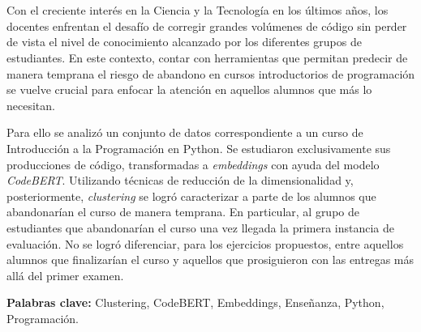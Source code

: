 \chapter*{\runtitulo}

\noindent Con el creciente interés en la Ciencia y la Tecnología en los últimos años, los docentes enfrentan el desafío de corregir grandes volúmenes de código sin perder de vista el nivel de conocimiento alcanzado por los diferentes grupos de estudiantes. En este contexto, contar con herramientas que permitan predecir de manera temprana el riesgo de abandono en cursos introductorios de programación se vuelve crucial para enfocar la atención en aquellos alumnos que más lo necesitan.

Para ello se analizó  un conjunto de datos correspondiente a un curso de Introducción a la Programación en Python. Se estudiaron exclusivamente sus producciones de código, transformadas a \emph{embeddings} con ayuda del modelo \emph{CodeBERT}. Utilizando técnicas de reducción de la dimensionalidad y, posteriormente, \emph{clustering} se logró caracterizar a parte de los alumnos que abandonarían el curso de manera temprana. En particular, al grupo de estudiantes que abandonarían el curso una vez llegada la primera instancia de evaluación. No se logró diferenciar, para los ejercicios propuestos, entre aquellos alumnos que finalizarían el curso y aquellos que prosiguieron con las entregas más allá del primer examen. 

\bigskip

\noindent\textbf{Palabras clave:} Clustering, CodeBERT, Embeddings, Enseñanza, Python, Programación.